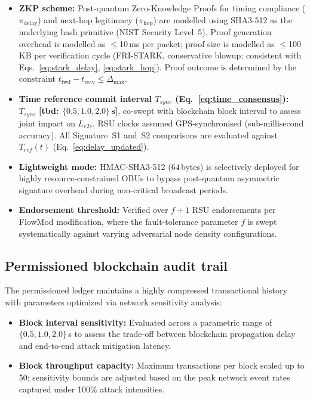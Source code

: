 \documentclass[12pt, a4paper]{report}
\begin{document}
{{\begin{itemize}
    \item \textbf{ZKP scheme:} Post-quantum Zero-Knowledge Proofs for timing
    compliance ($\pi_{\text{delay}}$) and next-hop legitimacy ($\pi_{\text{hop}}$)
    are modelled using SHA3-512 as the underlying hash primitive (NIST Security
    Level~5). Proof generation overhead is modelled as $\leq$10\,ms per packet;
    proof size is modelled as $\leq$100\,KB per
  verification cycle (FRI-STARK, conservative
  blowup; consistent with Eqs.~\ref{eq:stark_delay},
    \ref{eq:stark_hop}).
 Proof outcome
    is determined by the constraint $t_{\text{fwd}} - t_{\text{recv}} \leq
    \Delta_{\max}$.
    
\item \textbf{Time reference commit interval
    $T_{sync}$ (Eq.~\ref{eq:time_consensus}):}
    $T_{sync}$ \textbf{[tbd:
    $\{0.5, 1.0, 2.0\}$\,s]}, co-swept with
    blockchain block interval to assess joint
    impact on $L_{e2e}$. RSU clocks assumed
    GPS-synchronised (sub-millisecond accuracy).
    All Signature~S1 and~S2 comparisons are
    evaluated against $T_{ref}(t)$
    (Eq.~\ref{eq:delay_updated}).

    \item \textbf{Lightweight mode:} HMAC-SHA3-512 ($64$\,bytes) is selectively deployed for highly resource-constrained OBUs to bypass post-quantum asymmetric signature overhead during non-critical broadcast periods.
    \item \textbf{Endorsement threshold:} Verified over $f+1$ RSU endorsements per FlowMod modification, where the fault-tolerance parameter $f$ is swept systematically against varying adversarial node density configurations.
\end{itemize}

\subsection{Permissioned blockchain audit trail}
The permissioned ledger maintains a highly compressed transactional history with parameters optimized via network sensitivity analysis:

\begin{itemize}
    \item \textbf{Block interval sensitivity:} Evaluated across a parametric range of $\{0.5, 1.0, 2.0\}$\,s to assess the trade-off between blockchain propagation delay and end-to-end attack mitigation latency.
    \item \textbf{Block throughput capacity:} Maximum transactions per block scaled up to 50; sensitivity bounds are adjusted based on the peak network event rates captured under 100\% attack intensities.
    

\end{itemize}}}
\end{document}
